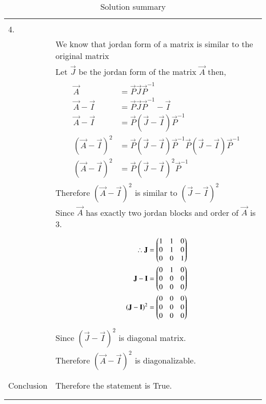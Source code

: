 \documentclass[journal,12pt]{IEEEtran}
\begin{document}
\begin{longtable}{|l|l|}
&\\
\hline
\pagebreak
\hline
&\\
4.&\\
&We know that jordan form of a matrix is similar to the original matrix\\
&Let $\vec{J}$ be the jordan form of the matrix $\vec{A}$ then,\\
&\parbox{6cm}{\begin{align*}
    \vec{A}&=\vec{P}\vec{J}\vec{P}^{-1}\\
    \vec{A}-\vec{I}&=\vec{P}\vec{J}\vec{P}^{-1}-\vec{I}\\
    \vec{A}-\vec{I}&=\vec{P}(\vec{J}-\vec{I})\vec{P}^{-1}\\
    (\vec{A}-\vec{I})^2&=\vec{P}(\vec{J}-\vec{I})\vec{P}^{-1}\vec{P}(\vec{J}-\vec{I})\vec{P}^{-1}\\
    (\vec{A}-\vec{I})^2&=\vec{P}(\vec{J}-\vec{I})^2\vec{P}^{-1}
\end{align*}}\\
&Therefore $(\vec{A}-\vec{I})^2$ is similar to $(\vec{J}-\vec{I})^2$\\
&Since $\vec{A}$ has exactly two jordan blocks and order of $\vec{A}$ is 3.\\
&\parbox{6cm}{\begin{align*}
    \therefore \mathbf{J}&=\begin{pmatrix}1&1&0\\0&1&0\\0&0&1\end{pmatrix}\\
    \mathbf{J}-\mathbf{I}&=\begin{pmatrix}0&1&0\\0&0&0\\0&0&0\end{pmatrix}\\
    (\mathbf{J}-\mathbf{I})^2&=\begin{pmatrix}0&0&0\\0&0&0\\0&0&0\end{pmatrix}
\end{align*}}\\
&Since $(\vec{J}-\vec{I})^2$ is diagonal matrix.\\
&Therefore $(\vec{A}-\vec{I})^2$ is diagonalizable.\\
&\\
\hline
&\\
Conclusion&Therefore the statement is True.\\
&\\
\hline
\caption{Solution summary}
\label{table:2}
\end{longtable}
\end{document}
